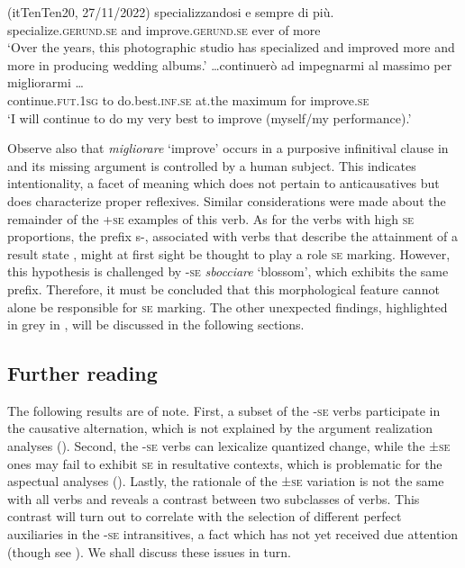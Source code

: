 \documentclass[output=paper,colorlinks,citecolor=brown
]{langscibook}
\begin{document}
\ea (itTenTen20, 27/11/2022)\label{bentley_example_7}
    \ea \label{bentley_example_7a}
     specializzandosi e  sempre di	più. \\
    {} specialize.\textsc{gerund}.\textsc{se} and improve.\textsc{gerund}.\textsc{se} ever of more\\
    \glt ‘Over the years, this photographic studio has specialized and improved more and more in producing wedding albums.’
    \ex \label{bentley_example_7b}
    \gll  \ldots  continuerò ad impegnarmi al massimo per migliorarmi \ldots  \\
    continue.\textsc{fut}.1\textsc{sg}	to do.best.\textsc{inf}.\textsc{se} at.the maximum for improve.\textsc{se} \\
    \glt ‘I will continue to do my very best to improve (myself/my performance).’
    \z
\z

Observe also that \textit{migliorare} ‘improve’ occurs in a purposive infinitival clause in  and its missing argument is controlled by a human subject. This indicates intentionality, a facet of meaning which does not pertain to anticausatives but does characterize proper reflexives. Similar considerations were made about the remainder of the +\textsc{se} examples of this verb. 
As for the verbs with high \textsc{se} proportions, the prefix s-, associated with verbs that describe the attainment of a result state \citep[112, 146, 159]{iacobini2004prefissazione}, might at first sight be thought to play a role \textsc{se} marking. However, this hypothesis is challenged by -\textsc{se} \textit{sbocciare} ‘blossom’, which exhibits the same prefix. Therefore, it must be concluded that this morphological feature cannot alone be responsible for \textsc{se} marking. The other unexpected findings, highlighted in grey in , will be discussed in the following sections.  

\subsection{Further reading}
\label{bentley_section_3.3}
The following results are of note. First, a subset of the -\textsc{se} verbs participate in the causative alternation, which is not explained by the argument realization analyses (). Second, the -\textsc{se} verbs can lexicalize quantized change, while the ±\textsc{se} ones may fail to exhibit \textsc{se} in resultative contexts, which is problematic for the aspectual analyses (). Lastly, the rationale of the ±\textsc{se} variation is not the same with all verbs and reveals a contrast between two subclasses of verbs. 
This contrast will turn out to correlate with the selection of different perfect auxiliaries in the -\textsc{se} intransitives, a fact which has not yet received due attention (though see \cite{bentley2021two}). We shall discuss these issues in turn.
\end{document}
